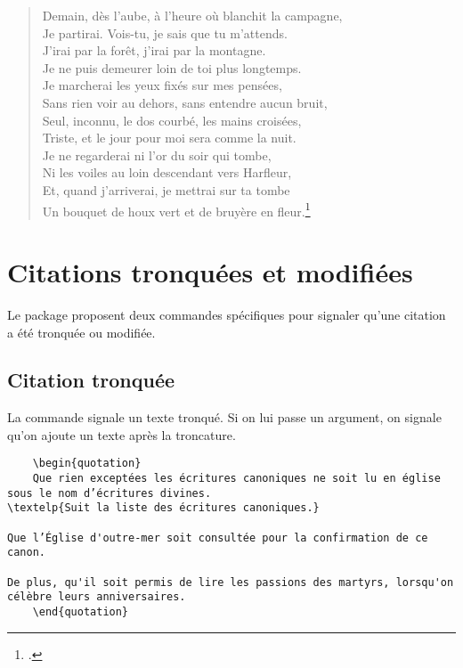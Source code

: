 \begin{verse}


Demain, dès l'aube, à l'heure où blanchit la campagne,\\
Je partirai. Vois-tu, je sais que tu m'attends.\\
J'irai par la forêt, j'irai par la montagne.\\
Je ne puis demeurer loin de toi plus longtemps.\\

Je marcherai les yeux fixés sur mes pensées,\\
Sans rien voir au dehors, sans entendre aucun bruit,\\
Seul, inconnu, le dos courbé, les mains croisées,\\
Triste, et le jour pour moi sera comme la nuit.\\

Je ne regarderai ni l'or du soir qui tombe,\\
Ni les voiles au loin descendant vers Harfleur,\\
Et, quand j'arriverai, je mettrai sur ta tombe\\
Un bouquet de houx vert et de bruyère en fleur.\footcite{demain}\\

\end{verse}

\section{Citations tronquées et modifiées}

Le package  proposent deux commandes spécifiques pour signaler qu'une citation a été tronquée ou modifiée.

\subsection{Citation tronquée}

La commande  signale un texte tronqué. Si on lui passe un argument, on signale qu'on ajoute un texte après la troncature.

\begin{verbatim}
	\begin{quotation}
	Que rien exceptées les écritures canoniques ne soit lu en église sous le nom d’écritures divines.
\textelp{Suit la liste des écritures canoniques.}

Que l’Église d'outre-mer soit consultée pour la confirmation de ce canon.

De plus, qu'il soit permis de lire les passions des martyrs, lorsqu'on célèbre leurs anniversaires.
	\end{quotation}
\end{verbatim}

